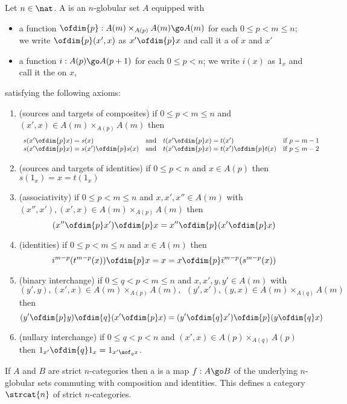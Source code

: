 \begin{defn}	
Let $n\in\nat$.  A  is an $n$-globular set $A$
equipped with
%
\begin{itemize}
\item a function $\ofdim{p}: A(m) \times_{A(p)} A(m) \go A(m)$%
% 
%
for each $0\leq
  p < m \leq n$; we write $\ofdim{p}(x', x)$ as $x' \ofdim{p} x$ and call
  it a  of $x$ and $x'$
% 
\item a function $i: A(p) \go A(p+1)$%
% 
%
for each $0 \leq p < n$; we write $i(x)$ as $1_x$%
% 
%
and call it the
 on $x$,
\end{itemize}
%
satisfying the following axioms:
%
\begin{enumerate}
\item	{}
(sources and targets of composites) if $0\leq p < m \leq n$ and $(x',
x) \in A(m) \times_{A(p)} A(m)$ then
\[
\begin{array}{llll}
s(x' \ofdim{p} x) = 
s(x) 			&	
\textrm{and}			&
t(x' \ofdim{p} x) = 
t(x') 			&
\textrm{if }
p = m-1	\\
s(x' \ofdim{p} x) = 
s(x') \ofdim{p} s(x)	&
\textrm{and}			&
t(x' \ofdim{p} x) = 
t(x') \ofdim{p} t(x)	&
\textrm{if }
p \leq m-2
\end{array}
\]
\item	%
(sources and targets of identities) if $0 \leq p < n$ and $x \in
  A(p)$ then $s(1_x) = x = t(1_x)$
\item (associativity) if $0\leq p < m \leq n$ and $x, x', x''
  \in A(m)$ with $(x'', x'), (x', x) \in A(m) \times_{A(p)} A(m)$ then
  \[
  (x'' \ofdim{p} x') \ofdim{p} x 
  = 
  x'' \ofdim{p} (x' \ofdim{p} x)
  \]
\item (identities) if $0\leq p < m \leq n$ and $x\in A(m)$ then 
  \[
  i^{m-p}(t^{m-p}(x)) \ofdim{p} x
  = 
  x
  =
  x \ofdim{p} i^{m-p}(s^{m-p}(x))
  \]
\item (binary interchange)%
%
%
if $0\leq q < p < m \leq n$ and $x, x', y, y'
  \in A(m)$ with
  \[
  (y', y), (x', x) \in A(m) \times_{A(p)} A(m),
  \ \ 
  (y', x'), (y, x) \in A(m) \times_{A(q)} A(m)
  \]
  then 
  \[
  (y' \ofdim{p} y) \ofdim{q} (x' \ofdim{p} x) 
  = 
  (y' \ofdim{q} x') \ofdim{p} (y \ofdim{q} x)
  \]
\item (nullary interchange)%
%
%
if $0\leq q < p < n$ and $(x', x) \in A(p)
  \times_{A(q)} A(p)$ then $1_{x'} \ofdim{q} 1_x = 1_{x' \sof_q x}$.
\end{enumerate}
%
If $A$ and $B$ are strict $n$-categories then a %
%
%
is a map $f: A \go B$ of the underlying $n$-globular sets commuting with
composition and identities.  This defines a category $\strcat{n}$ of strict
$n$-categories. 
\end{defn}

